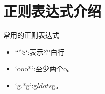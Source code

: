 \documentclass{book}
\begin{document}
\section{正则表达式介绍}
常用的正则表达式
\begin{itemize}
\item ``${}^\wedge$\$`:表示空白行
\item `ooo*`:至少两个o。
\item `g.*g`:g$ldots$g。
\end{itemize}
\begin{center}


\end{center}
\end{document}
